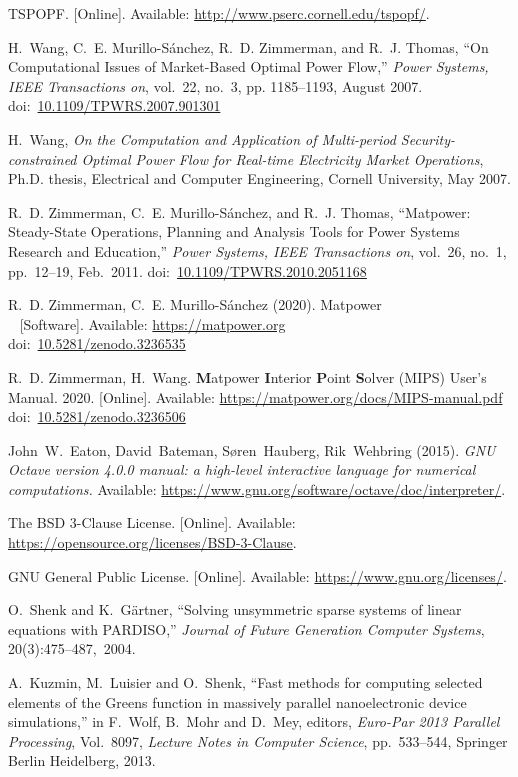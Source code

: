 \documentclass[12pt]{article}
\newcommand{\matpower}[0]{{\sc Matpower}}
\newcommand{\mips}[0]{{MIPS}}
\newcommand{\mipsname}[0]{{{\bf M}{\sc atpower} \textbf{I}nterior \textbf{P}oint \textbf{S}olver}}
\newcommand{\doi}[1]{doi:~\href{https://doi.org/#1}{#1}}
\numberwithin{equation}{section}
\numberwithin{table}{section}
\numberwithin{figure}{section}
\begin{document}
\clearpage
\begin{thebibliography}{99}
TSPOPF. [Online]. Available: \url{http://www.pserc.cornell.edu/tspopf/}.

H.~Wang, C.~E. Murillo-S{\'a}nchez, R.~D. Zimmerman, and R.~J. Thomas, ``On
Computational Issues of Market-Based Optimal Power Flow,'' \emph{Power
Systems, IEEE Transactions on}, vol.~22, no.~3, pp. 1185--1193, August 2007.
\doi{10.1109/TPWRS.2007.901301}

H.~Wang, \emph{On the Computation and Application of Multi-period Security-constrained Optimal Power Flow for Real-time Electricity Market Operations}, Ph.D. thesis, Electrical and Computer Engineering, Cornell University, May 2007.

R.~D. Zimmerman, C.~E. Murillo-S{\'a}nchez, and R.~J. Thomas, ``\matpower{}: Steady-State Operations, Planning and Analysis Tools for Power Systems Research and Education,'' \emph{Power Systems, IEEE Transactions on}, vol.~26, no.~1, pp.~12--19, Feb.~2011.
\doi{10.1109/TPWRS.2010.2051168}

R.~D. Zimmerman, C.~E. Murillo-S{\'a}nchez (2020). \matpower{}\\~
[Software]. Available: \url{https://matpower.org}\\
\doi{10.5281/zenodo.3236535}

R.~D. Zimmerman, H.~Wang. \mipsname{} (\mips{}) User's Manual. 2020.
[Online]. Available: \url{https://matpower.org/docs/MIPS-manual.pdf}\\
\doi{10.5281/zenodo.3236506}

John~W.~Eaton, David~Bateman, S{\o}ren~Hauberg, Rik~Wehbring (2015). \emph{GNU Octave version 4.0.0 manual: a high-level interactive language for numerical computations.} Available: \url{https://www.gnu.org/software/octave/doc/interpreter/}.

The BSD 3-Clause License. [Online]. Available: \url{https://opensource.org/licenses/BSD-3-Clause}.

GNU General Public License. [Online]. Available: \url{https://www.gnu.org/licenses/}.

O.~Shenk and K.~G\"artner, ``Solving unsymmetric sparse systems of linear equations with PARDISO,'' \emph{Journal of Future Generation Computer Systems}, 20(3):475--487,~2004.

A.~Kuzmin, M.~Luisier and O.~Shenk, ``Fast methods for computing selected elements of the Greens function in massively parallel nanoelectronic device simulations,'' in F.~Wolf, B.~Mohr and D.~Mey, editors, \emph{Euro-Par 2013 Parallel Processing}, Vol.~8097, \emph{Lecture Notes in Computer Science}, pp.~533--544, Springer Berlin Heidelberg, 2013.

\end{thebibliography}
\end{document}
